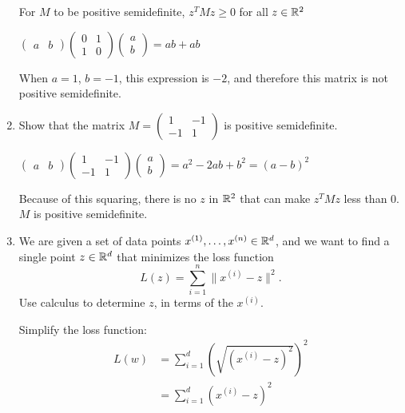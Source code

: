\documentclass[10pt]{report}
\begin{document}
\begin{enumerate}
\begin{solution}
  For $M$ to be positive semidefinite, $z^TMz \geq 0$ for all $z \in {\mathbb R}^2$

  $
  \begin{pmatrix}
    a & b
  \end{pmatrix}
  \begin{pmatrix}
    0 & 1 \\ 1 & 0
  \end{pmatrix}
  \begin{pmatrix}
    a \\ b
  \end{pmatrix}
  = ab + ab
  $

  When $a=1$, $b=-1$, this expression is $-2$, and therefore this matrix is not positive semidefinite.

\end{solution}

\item Show that the matrix $M = \begin{pmatrix} 1 & -1 \\ -1 & 1 \end{pmatrix}$ is positive semidefinite.
\begin{solution}

  $
  \begin{pmatrix}
    a & b
  \end{pmatrix}
  \begin{pmatrix}
    1 & -1 \\ -1 & 1
  \end{pmatrix}
  \begin{pmatrix}
    a \\ b
  \end{pmatrix}
  = a^2-2ab+b^2=(a-b)^2
  $

  Because of this squaring, there is no $z$ in ${\mathbb R}^2$ that can make $z^TMz$ less than 0. $M$ is positive semidefinite.

\end{solution}

\item We are given a set of data points $x^{(1)}, \ldots, x^{(n)} \in {\mathbb R}^d$, and we want to find a single point $z \in {\mathbb R}^d$ that minimizes the loss function
$$ L(z) = \sum_{i=1}^n \|x^{(i)} - z \|^2 .$$
Use calculus to determine $z$, in terms of the $x^{(i)}$.
\begin{solution}
  Simplify the loss function:
  \begin{align*}
    L(w) &= \sum_{i=1}^d{\left(\sqrt{\left(x^{(i)}-z\right)^2}\right)^2} \\
    &= \sum_{i=1}^d{\left(x^{(i)}-z\right)^2}
  \end{align*}


\end{solution}
\end{enumerate}
\end{document}
